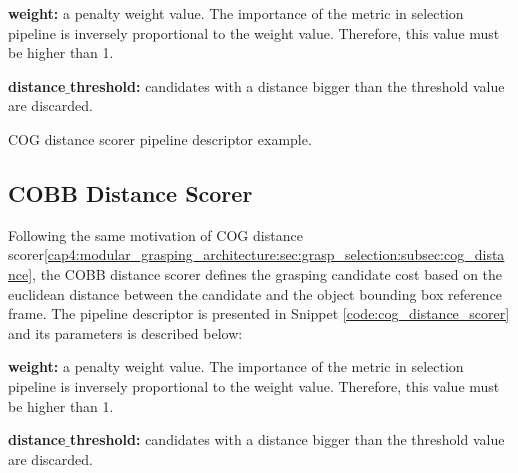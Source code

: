\begin{itemize_jp}
    \item \textbf{weight:} a penalty weight value. The importance of the metric in selection pipeline is inversely proportional to the weight value. Therefore, this value must be higher than 1.
    \item \textbf{distance$\_$threshold:} candidates with a distance bigger than the threshold value are discarded.
\end{itemize_jp}


\begin{snippet}[h!]
\centering
{}
\caption{\ac{COG} distance scorer pipeline descriptor example.}
\label{code:cog_distance_scorer}
\end{snippet}

\subsection{\acl{COBB} Distance Scorer}
\label{cap4:modular_grasping_architecture:sec:grasp_selection:subsec:cobb_distance}

Following the same motivation of \ac{COG} distance scorer\ref{cap4:modular_grasping_architecture:sec:grasp_selection:subsec:cog_distance}, the \ac{COBB} distance scorer defines the grasping candidate cost based on the euclidean distance between the candidate and the object bounding box reference frame. The pipeline descriptor is presented in Snippet \ref{code:cog_distance_scorer} and its parameters is described below:

\begin{itemize_jp}
    \item \textbf{weight:} a penalty weight value. The importance of the metric in selection pipeline is inversely proportional to the weight value. Therefore, this value must be higher than 1.
    \item \textbf{distance$\_$threshold:} candidates with a distance bigger than the threshold value are discarded.
\end{itemize_jp}


